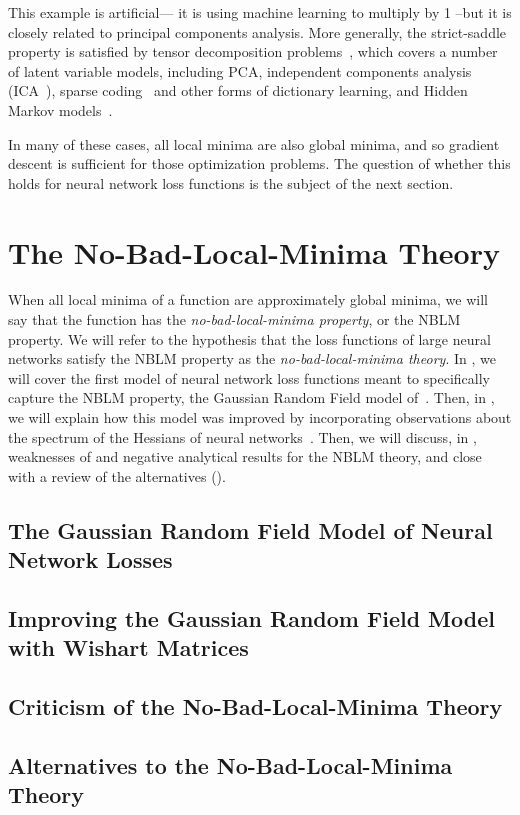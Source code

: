 \documentclass[../../thesis.tex]{subfiles}
\begin{document}
This example is artificial---
it is using machine learning to multiply by 1
--but it is closely related to principal components analysis.
More generally, the strict-saddle property is
satisfied by tensor decomposition problems~\cite{ge2015},
which covers a number of latent variable models, including
PCA,
independent components analysis (ICA~\cite{bell1997,comon2009}),
sparse coding~\cite{olshausen1996}
and other forms of dictionary learning,
and Hidden Markov models~\cite{anandkumar2012}.

In many of these cases,
all local minima are also global minima,
and so gradient descent is sufficient for
those optimization problems.
The question of whether this holds for neural network loss functions
is the subject of the next section.

\section{The No-Bad-Local-Minima Theory}

When all local minima of a function
are approximately global minima,
we will say that the function has the
\emph{no-bad-local-minima property},
or the NBLM property.
We will refer to the hypothesis that
the loss functions of large neural networks
satisfy the NBLM property as the
\emph{no-bad-local-minima theory}.
In ,
we will cover the first model of neural network loss functions
meant to specifically capture the NBLM property,
the Gaussian Random Field model of~\cite{dauphin2014}.
Then, in ,
we will explain how this model was improved
by incorporating observations about the spectrum
of the Hessians of neural networks~\cite{pennington2017}.
Then, we will discuss, in ,
weaknesses of and negative analytical results for the NBLM theory,
and close with a review of the alternatives ().

\subsection{The Gaussian Random Field Model of Neural Network Losses}
\subsection{Improving the Gaussian Random Field Model with Wishart Matrices}
\subsection{Criticism of the No-Bad-Local-Minima Theory}
\subsection{Alternatives to the No-Bad-Local-Minima Theory}

\onlyinsubfile{\printbibliography}
\end{document}
